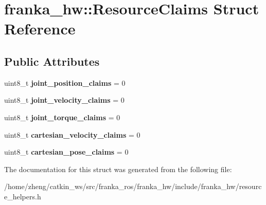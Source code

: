 \hypertarget{structfranka__hw_1_1_resource_claims}{}\section{franka\+\_\+hw\+:\+:Resource\+Claims Struct Reference}
\label{structfranka__hw_1_1_resource_claims}
\subsection*{Public Attributes}
\begin{DoxyCompactItemize}
\item 
\mbox{\label{structfranka__hw_1_1_resource_claims_aaceed7e0978a7f78a285f9475b46e38d}} 
uint8\+\_\+t {\bfseries joint\+\_\+position\+\_\+claims} = 0
\item 
\mbox{\label{structfranka__hw_1_1_resource_claims_ada8a410eb33611ecadffcc9c34c249e9}} 
uint8\+\_\+t {\bfseries joint\+\_\+velocity\+\_\+claims} = 0
\item 
\mbox{\label{structfranka__hw_1_1_resource_claims_a9867b095f677700e538c80a26325c938}} 
uint8\+\_\+t {\bfseries joint\+\_\+torque\+\_\+claims} = 0
\item 
\mbox{\label{structfranka__hw_1_1_resource_claims_a2668310af64175428ebde96da920c9bb}} 
uint8\+\_\+t {\bfseries cartesian\+\_\+velocity\+\_\+claims} = 0
\item 
\mbox{\label{structfranka__hw_1_1_resource_claims_a55a5153f3db3a7fcf512704d585b70f7}} 
uint8\+\_\+t {\bfseries cartesian\+\_\+pose\+\_\+claims} = 0
\end{DoxyCompactItemize}


The documentation for this struct was generated from the following file\+:\begin{DoxyCompactItemize}
\item 
/home/zheng/catkin\+\_\+ws/src/franka\+\_\+ros/franka\+\_\+hw/include/franka\+\_\+hw/resource\+\_\+helpers.\+h\end{DoxyCompactItemize}
